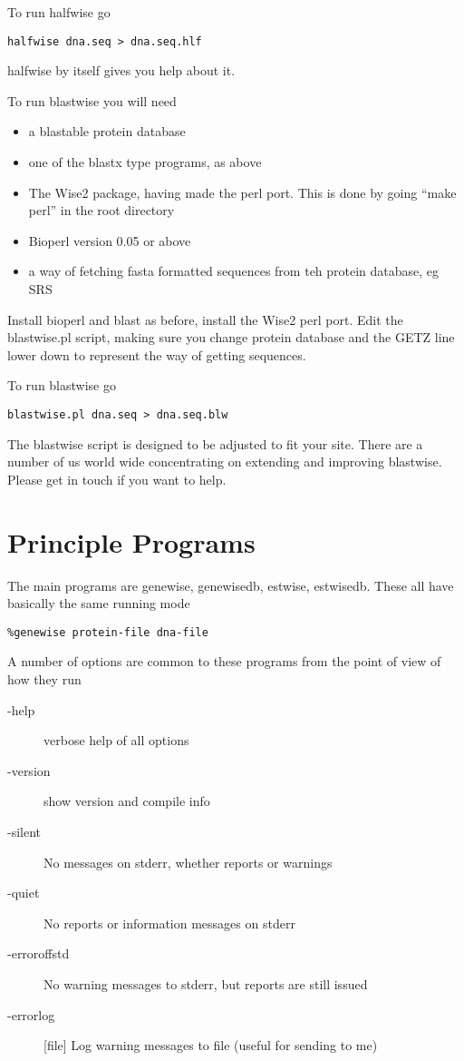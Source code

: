 \documentclass{article}
\begin{document}
To run halfwise go
\begin{verbatim}
halfwise dna.seq > dna.seq.hlf
\end{verbatim}

halfwise by itself gives you help about it.

To run blastwise you will need
\begin{itemize}
\item a blastable protein database
\item one of the blastx type programs, as above
\item The Wise2 package, having made the perl port. This is done by going
``make perl'' in the root directory
\item Bioperl version 0.05 or above
\item a way of fetching fasta formatted sequences from teh protein database, eg SRS
\end{itemize}

Install bioperl and blast as before, install the Wise2 perl port. Edit
the blastwise.pl script, making sure you change protein database and
the GETZ line lower down to represent the way of getting sequences.

To run blastwise go
\begin{verbatim}
blastwise.pl dna.seq > dna.seq.blw
\end{verbatim}

The blastwise script is designed to be adjusted to fit your site. There
are a number of us world wide concentrating on extending and improving blastwise.
Please get in touch if you want to help.
\section{Principle Programs}

The main programs are genewise, genewisedb, estwise, estwisedb. 
These all have basically the same
running mode

\begin{verbatim}
%genewise protein-file dna-file
\end{verbatim}

A number of options are common to these programs from the point
of view of how they run

\begin{description}
\item[-help] verbose help of all options
\item[-version]   show version and compile info
\item[-silent] No messages on stderr, whether reports or warnings
\item[-quiet] No reports or information messages on stderr
\item[-erroroffstd] No warning messages to stderr, but reports are still issued
\item[-errorlog] [file] Log warning messages to file (useful for sending to me)
\end{description}
\end{document}
